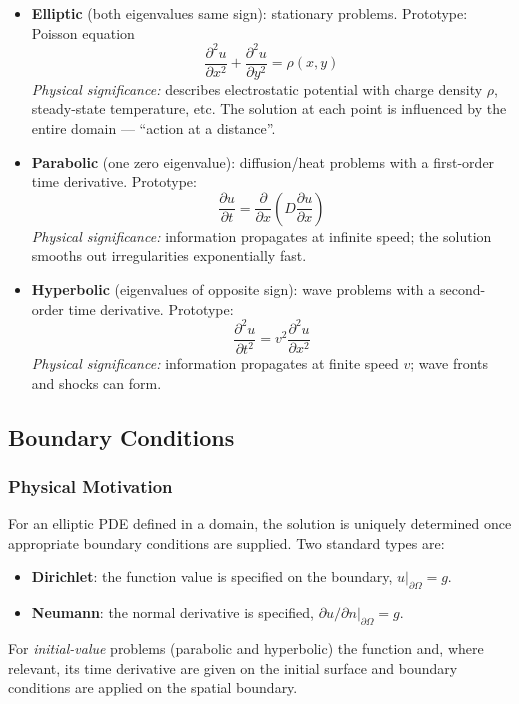 \begin{itemize}
  \item \textbf{Elliptic} (both eigenvalues same sign): stationary
    problems. Prototype: Poisson equation
    \begin{equation}
      \boxed{\frac{\partial^2 u}{\partial x^2}
        +\frac{\partial^2 u}{\partial y^2}
        = \rho(x,y)}
      \label{eq:lec08:poisson}
    \end{equation}
    \textit{Physical significance:} describes electrostatic potential
    with charge density $\rho$, steady-state temperature, etc.  The
    solution at each point is influenced by the entire domain —
    ``action at a distance''.

  \item \textbf{Parabolic} (one zero eigenvalue): diffusion/heat
    problems with a first-order time derivative. Prototype:
    \begin{equation}
      \boxed{\frac{\partial u}{\partial t}
        = \frac{\partial}{\partial x}
          \!\left(D\frac{\partial u}{\partial x}\right)}
      \label{eq:lec08:diffusion}
    \end{equation}
    \textit{Physical significance:} information propagates at
    infinite speed; the solution smooths out irregularities
    exponentially fast.

  \item \textbf{Hyperbolic} (eigenvalues of opposite sign): wave
    problems with a second-order time derivative. Prototype:
    \begin{equation}
      \boxed{\frac{\partial^2 u}{\partial t^2}
        = v^2\frac{\partial^2 u}{\partial x^2}}
      \label{eq:lec08:wave}
    \end{equation}
    \textit{Physical significance:} information propagates at finite
    speed $v$; wave fronts and shocks can form.
\end{itemize}

\subsection{Boundary Conditions}\label{subsec:lec08:bcs}

\subsubsection*{Physical Motivation}
For an elliptic PDE defined in a domain, the solution is uniquely
determined once appropriate boundary conditions are supplied.
Two standard types are:
\begin{itemize}
  \item \textbf{Dirichlet}: the function value is specified on the
    boundary, $u\big|_{\partial\Omega}=g$.
  \item \textbf{Neumann}: the normal derivative is specified,
    $\partial u/\partial n\big|_{\partial\Omega}=g$.
\end{itemize}
For \emph{initial-value} problems (parabolic and hyperbolic) the
function and, where relevant, its time derivative are given on the
initial surface and boundary conditions are applied on the spatial
boundary.


